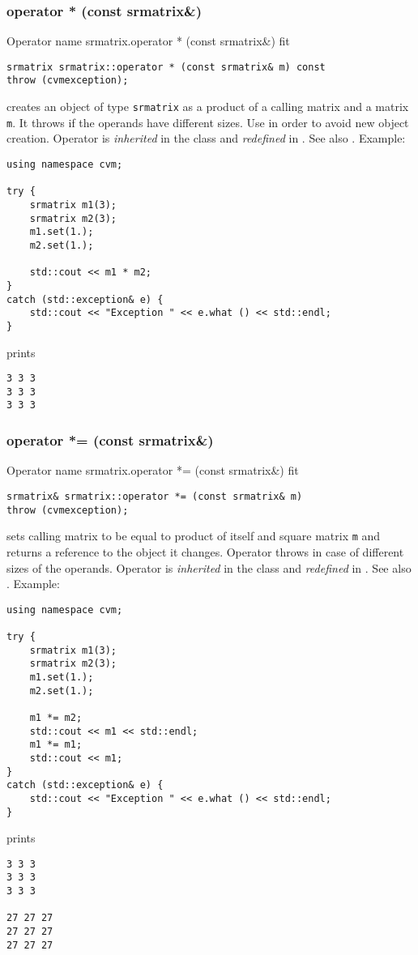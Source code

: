 \subsubsection{operator * (const srmatrix\&)}
Operator%
\pdfdest name {srmatrix.operator * (const srmatrix&)} fit
\begin{verbatim}
srmatrix srmatrix::operator * (const srmatrix& m) const
throw (cvmexception);
\end{verbatim}
creates an object of type \verb"srmatrix"
as a product of a calling matrix and a matrix \verb"m".
It throws  
if the operands have different sizes.
Use  in order to avoid
 new object creation.
Operator is \emph{inherited} in the class
and \emph{redefined} in .
See also
.
Example:
\begin{Verbatim}
using namespace cvm;

try {
    srmatrix m1(3);
    srmatrix m2(3);
    m1.set(1.);
    m2.set(1.);

    std::cout << m1 * m2;
}
catch (std::exception& e) {
    std::cout << "Exception " << e.what () << std::endl;
}
\end{Verbatim}
prints
\begin{Verbatim}
3 3 3
3 3 3
3 3 3
\end{Verbatim}
\newpage



\subsubsection{operator *= (const srmatrix\&)}
Operator%
\pdfdest name {srmatrix.operator *= (const srmatrix&)} fit
\begin{verbatim}
srmatrix& srmatrix::operator *= (const srmatrix& m)
throw (cvmexception);
\end{verbatim}
sets  calling matrix to be equal to  product
of itself and square matrix \verb"m"
and returns a reference to
the object it changes.
Operator throws 
in case of different sizes of the operands.
Operator is \emph{inherited} in the class
and \emph{redefined} in .
See also .
Example:
\begin{Verbatim}
using namespace cvm;

try {
    srmatrix m1(3);
    srmatrix m2(3);
    m1.set(1.);
    m2.set(1.);

    m1 *= m2;
    std::cout << m1 << std::endl;
    m1 *= m1;
    std::cout << m1;
}
catch (std::exception& e) {
    std::cout << "Exception " << e.what () << std::endl;
}
\end{Verbatim}
prints
\begin{Verbatim}
3 3 3
3 3 3
3 3 3

27 27 27
27 27 27
27 27 27
\end{Verbatim}
\newpage





